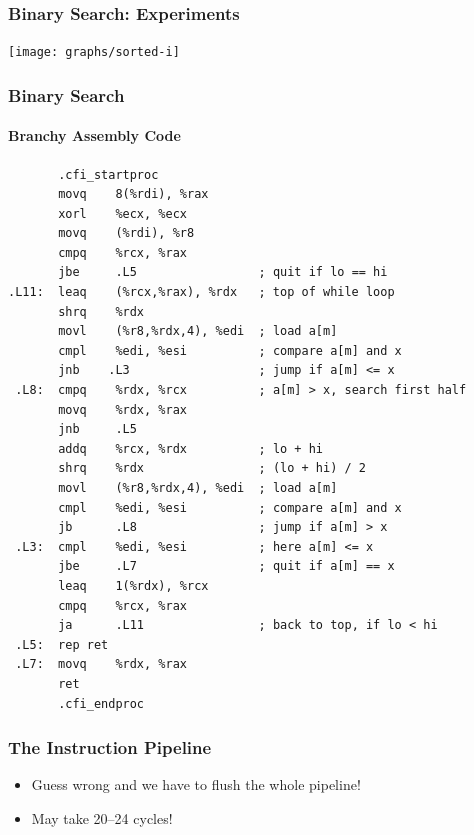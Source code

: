 \documentclass[xcolor=dvipsnames]{beamer}
\newcommand{\mi}[1]{\multiinclude[<+>][start=1,format=pdf]{#1}}
\begin{document}
\begin{frame}
  \frametitle{Binary Search: Experiments}
  \begin{center}
    \texttt{[image: graphs/sorted-i]}
  \end{center}
\end{frame}

\begin{frame}[fragile]
  \frametitle{Binary Search}
  \framesubtitle{Branchy Assembly Code}

\tiny
\begin{verbatim}
       .cfi_startproc
       movq    8(%rdi), %rax
       xorl    %ecx, %ecx
       movq    (%rdi), %r8
       cmpq    %rcx, %rax
       jbe     .L5                 ; quit if lo == hi
.L11:  leaq    (%rcx,%rax), %rdx   ; top of while loop
       shrq    %rdx
       movl    (%r8,%rdx,4), %edi  ; load a[m]
       cmpl    %edi, %esi          ; compare a[m] and x
       jnb    .L3                  ; jump if a[m] <= x
 .L8:  cmpq    %rdx, %rcx          ; a[m] > x, search first half
       movq    %rdx, %rax
       jnb     .L5
       addq    %rcx, %rdx          ; lo + hi
       shrq    %rdx                ; (lo + hi) / 2
       movl    (%r8,%rdx,4), %edi  ; load a[m]
       cmpl    %edi, %esi          ; compare a[m] and x
       jb      .L8                 ; jump if a[m] > x
 .L3:  cmpl    %edi, %esi          ; here a[m] <= x
       jbe     .L7                 ; quit if a[m] == x
       leaq    1(%rdx), %rcx
       cmpq    %rcx, %rax
       ja      .L11                ; back to top, if lo < hi
 .L5:  rep ret
 .L7:  movq    %rdx, %rax
       ret
       .cfi_endproc
\end{verbatim}

\end{frame}

\begin{frame}
   \frametitle{The Instruction Pipeline}

   \begin{center}
      \mi{figs/pipeline}
   \end{center}
   \vspace{-1em}
   \begin{itemize}
     \item<3->Guess wrong and we have to flush the whole pipeline!
     \item<4->May take 20--24 cycles!
   \end{itemize}
\end{frame}
\end{document}

